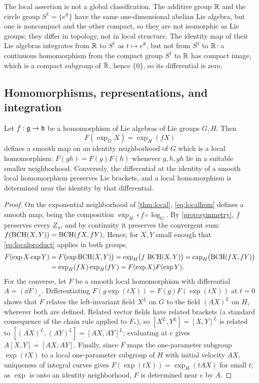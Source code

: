 The local assertion is not a global classification. The additive group
$\mathbb{R}$ and the circle group $S^1=\{e^{\ii t}\}$ have the same one-dimensional
abelian Lie algebra, but one is noncompact and the other compact, so they
are not isomorphic as Lie groups; they differ in topology, not in local
structure. The identity map of their Lie algebras integrates from $\mathbb{R}$ to
$S^1$ as $t\mapsto e^{\ii t}$, but not from $S^1$ to $\mathbb{R}$: a continuous
homomorphism from the compact group $S^1$ to $\mathbb{R}$ has compact image, which is
a compact subgroup of $\mathbb{R}$, hence $\{0\}$, so its differential is zero.

\subsection{Homomorphisms, representations, and integration}
\begin{theorem}\label{thm:localcorr}
Let $f:\mathfrak{g}\to\mathfrak{h}$ be a homomorphism of Lie algebras of Lie groups $G,H$. Then
\begin{equation}\label{eq:localhom}
 F(\exp_GX)=\exp_H(fX)
\end{equation}
defines a smooth map on an identity neighborhood of $G$ which is a local
homomorphism: $F(gh)=F(g)F(h)$ whenever $g,h,gh$ lie in a suitable smaller
neighborhood. Conversely, the differential at the identity of a smooth
local homomorphism preserves Lie brackets, and a local homomorphism is
determined near the identity by that differential.
\end{theorem}
\begin{proof}
On the exponential neighborhood of \cref{thm:local}, \eqref{eq:localhom}
defines a smooth map, being the composition $\exp_H\circ f\circ\log_G$. By
\cref{prop:symmetry}, $f$ preserves every $Z_n$, and by continuity it
preserves the convergent sum: $f(\operatorname{BCH}(X,Y))=\operatorname{BCH}(fX,fY)$. Hence, for $X,Y$
small enough that \eqref{eq:localproduct} applies in both groups,
\begin{align*}
 F(\exp X\exp Y)&=F\bigl(\exp\operatorname{BCH}(X,Y)\bigr)=\exp_H\bigl(f\,\operatorname{BCH}(X,Y)\bigr)
 =\exp_H\bigl(\operatorname{BCH}(fX,fY)\bigr)\\
 &=\exp_H(fX)\exp_H(fY)=F(\exp X)F(\exp Y).
\end{align*}
For the converse, let $F$ be a smooth local homomorphism with differential
$A=(\dd F)_e$. Differentiating $F(g\exp(tX))=F(g)F(\exp(tX))$ at $t=0$
shows that $F$ relates the left-invariant field $X^L$ on $G$ to the field
$(AX)^L$ on $H$, wherever both are defined. Related vector fields have
related brackets (a standard consequence of the chain rule applied to
$F_*$), so $[X^L,Y^L]=[X,Y]^L$ is related to $[(AX)^L,(AY)^L]=[AX,AY]^L$;
evaluating at $e$ gives $A[X,Y]=[AX,AY]$. Finally, since $F$ maps the
one-parameter subgroup $\exp(tX)$ to a local one-parameter subgroup of $H$
with initial velocity $AX$, uniqueness of integral curves gives
$F(\exp(tX))=\exp_H(tAX)$ for small $t$; as $\exp$ is onto an identity
neighborhood, $F$ is determined near $e$ by $A$.
\end{proof}

